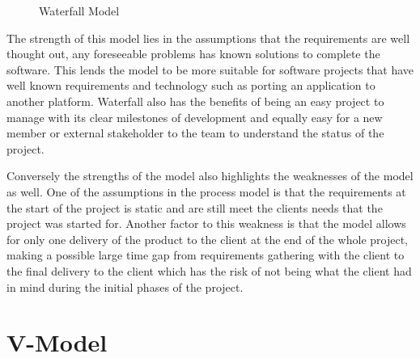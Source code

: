 \documentclass{style/CRPITStyle}
\begin{document}
\begin{figure}[htb]
\caption{\protect\label{xyz}  Waterfall Model}
\end{figure}

The strength of this model lies in the assumptions that the requirements are
well thought out, any foreseeable problems has known solutions to complete the
software.
This lends the model to be more suitable for software projects that have well known
requirements and technology such as porting an application to another platform.
Waterfall also has the benefits of being an easy project to manage with its
clear milestones of development and equally easy for a new member or external
stakeholder to the team to understand the status of the project.

\vspace{.1in}

Conversely the strengths of the model also highlights the weaknesses of the model as
well.
One of the assumptions in the process model is that the requirements at the start of the project is
static and are still meet the clients needs that the project was started for.
Another factor to this weakness is that the model allows for only one delivery of the product to
the client at the end of the whole project, making a possible large time gap from requirements 
gathering with the client to the final delivery to the client which has the risk of not being 
what the client had in mind during the initial phases of the project.

\section{V-Model} %
\end{document}
